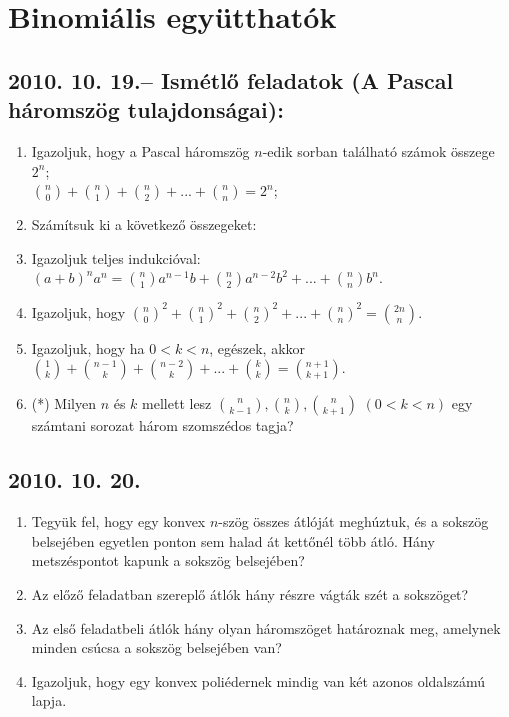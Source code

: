 \section{Binomiális együtthatók}

\subsection*{2010. 10. 19.-- Ismétlő feladatok (A Pascal háromszög tulajdonságai):}
\begin{enumerate}
\item Igazoljuk, hogy a Pascal háromszög $n$-edik sorban található számok összege $2^{n}$;
\\ $\binom{n}{0}+\binom{n}{1}+\binom{n}{2}+...+\binom{n}{n}=2^{n}$;
\item Számítsuk ki a következő összegeket:
\item Igazoljuk teljes indukcióval: $(a+b)^{n}a^{n}=\binom{n}{1}a^{n-1}b+\binom{n}{2}a^{n-2}b^{2}+...+\binom{n}{n}b^{n}$.
\item Igazoljuk, hogy  $\binom{n}{0}^{2}+\binom{n}{1}^{2}+\binom{n}{2}^{2}+...+\binom{n}{n}^{2}=\binom{2n}{n}$.
\item Igazoljuk, hogy ha $0<k<n$, egészek, akkor $\binom{1}{k}+\binom{n-1}{k}+\binom{n-2}{k}+...+\binom{k}{k}=\binom{n+1}{k+1}$.
\item (*) Milyen $n$ és $k$ mellett lesz $\binom{n}{k-1}, \binom{n}{k}, \binom{n}{k+1}$ $(0<k<n)$ egy számtani sorozat három szomszédos tagja?
\end{enumerate}


\subsection*{2010. 10. 20.}
\begin{enumerate}
\item Tegyük fel, hogy egy konvex $n$-szög összes átlóját meghúztuk, és a sokszög belsejében egyetlen ponton sem halad át kettőnél több átló. Hány metszéspontot kapunk a sokszög belsejében?
\item Az előző feladatban szereplő átlók hány részre vágták szét a sokszöget?
\item Az első feladatbeli átlók hány olyan háromszöget határoznak meg, amelynek minden csúcsa a sokszög belsejében van?
\item Igazoljuk, hogy egy konvex poliédernek  mindig van két azonos oldalszámú lapja.
\end{enumerate}


